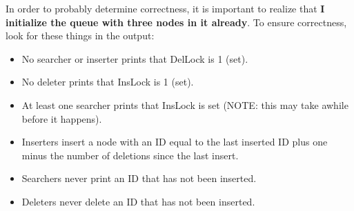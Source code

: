\documentclass[letterpaper,10pt,titlepage]{article}
\begin{document}
In order to probably determine correctness, it is important to realize that \textbf{I initialize the queue with three nodes in it already}.
To ensure correctness, look for these things in the output:
\begin{itemize}
	\item No searcher or inserter prints that DelLock is 1 (set).
    \item No deleter prints that InsLock is 1 (set).
    \item At least one searcher prints that InsLock is set (NOTE: this may take awhile before it happens).
    \item Inserters insert a node with an ID equal to the last inserted ID plus one minus the number of deletions since the last insert.
    \item Searchers never print an ID that has not been inserted.
    \item Deleters never delete an ID that has not been inserted.
\end{itemize}
\end{document}
